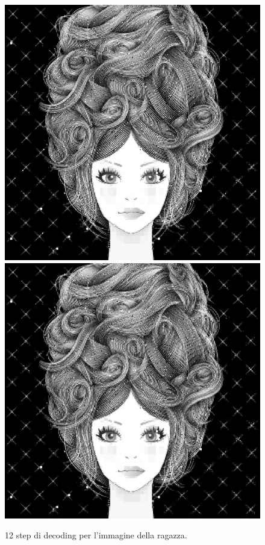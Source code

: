 \documentclass[11pt,a4paper,appendixprefix=true,numbers=noenddot]{scrreprt}
\begin{document}
\begin{figure}[!ht]
\includegraphics[scale=0.35]{images/girl11}
\includegraphics[scale=0.35]{images/girl12}         
\caption{12 step di decoding per l'immagine della ragazza.}
\label{fig:girls}
\end{figure}
\end{document}
